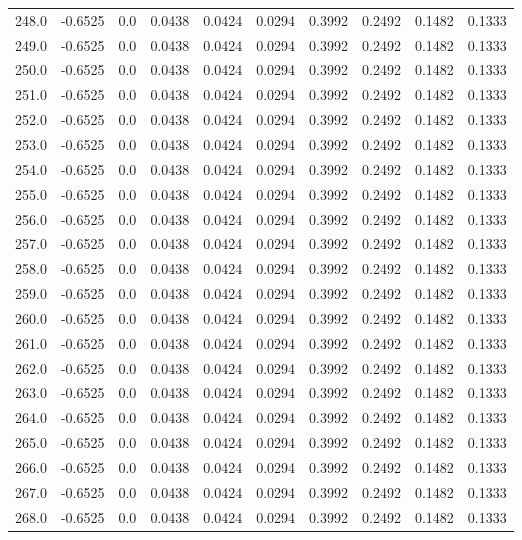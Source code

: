 \begin{longtable}{lrrrrrrrrr}
248.0 & -0.6525 & 0.0 & 0.0438 & 0.0424 & 0.0294 & 0.3992 & 0.2492 & 0.1482 & 0.1333 \\
249.0 & -0.6525 & 0.0 & 0.0438 & 0.0424 & 0.0294 & 0.3992 & 0.2492 & 0.1482 & 0.1333 \\
250.0 & -0.6525 & 0.0 & 0.0438 & 0.0424 & 0.0294 & 0.3992 & 0.2492 & 0.1482 & 0.1333 \\
251.0 & -0.6525 & 0.0 & 0.0438 & 0.0424 & 0.0294 & 0.3992 & 0.2492 & 0.1482 & 0.1333 \\
252.0 & -0.6525 & 0.0 & 0.0438 & 0.0424 & 0.0294 & 0.3992 & 0.2492 & 0.1482 & 0.1333 \\
253.0 & -0.6525 & 0.0 & 0.0438 & 0.0424 & 0.0294 & 0.3992 & 0.2492 & 0.1482 & 0.1333 \\
254.0 & -0.6525 & 0.0 & 0.0438 & 0.0424 & 0.0294 & 0.3992 & 0.2492 & 0.1482 & 0.1333 \\
255.0 & -0.6525 & 0.0 & 0.0438 & 0.0424 & 0.0294 & 0.3992 & 0.2492 & 0.1482 & 0.1333 \\
256.0 & -0.6525 & 0.0 & 0.0438 & 0.0424 & 0.0294 & 0.3992 & 0.2492 & 0.1482 & 0.1333 \\
257.0 & -0.6525 & 0.0 & 0.0438 & 0.0424 & 0.0294 & 0.3992 & 0.2492 & 0.1482 & 0.1333 \\
258.0 & -0.6525 & 0.0 & 0.0438 & 0.0424 & 0.0294 & 0.3992 & 0.2492 & 0.1482 & 0.1333 \\
259.0 & -0.6525 & 0.0 & 0.0438 & 0.0424 & 0.0294 & 0.3992 & 0.2492 & 0.1482 & 0.1333 \\
260.0 & -0.6525 & 0.0 & 0.0438 & 0.0424 & 0.0294 & 0.3992 & 0.2492 & 0.1482 & 0.1333 \\
261.0 & -0.6525 & 0.0 & 0.0438 & 0.0424 & 0.0294 & 0.3992 & 0.2492 & 0.1482 & 0.1333 \\
262.0 & -0.6525 & 0.0 & 0.0438 & 0.0424 & 0.0294 & 0.3992 & 0.2492 & 0.1482 & 0.1333 \\
263.0 & -0.6525 & 0.0 & 0.0438 & 0.0424 & 0.0294 & 0.3992 & 0.2492 & 0.1482 & 0.1333 \\
264.0 & -0.6525 & 0.0 & 0.0438 & 0.0424 & 0.0294 & 0.3992 & 0.2492 & 0.1482 & 0.1333 \\
265.0 & -0.6525 & 0.0 & 0.0438 & 0.0424 & 0.0294 & 0.3992 & 0.2492 & 0.1482 & 0.1333 \\
266.0 & -0.6525 & 0.0 & 0.0438 & 0.0424 & 0.0294 & 0.3992 & 0.2492 & 0.1482 & 0.1333 \\
267.0 & -0.6525 & 0.0 & 0.0438 & 0.0424 & 0.0294 & 0.3992 & 0.2492 & 0.1482 & 0.1333 \\
268.0 & -0.6525 & 0.0 & 0.0438 & 0.0424 & 0.0294 & 0.3992 & 0.2492 & 0.1482 & 0.1333 \\

\end{longtable}

